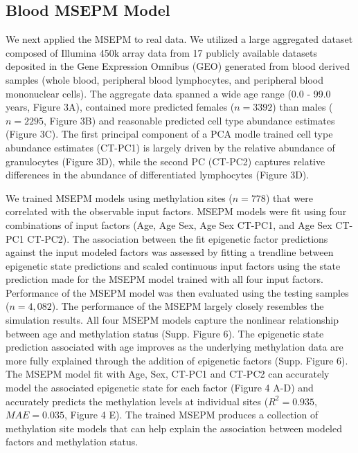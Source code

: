 \documentclass[sn-nature]{sn-jnl}
\begin{document}
{\begin{linenumbers}
\subsection{Blood MSEPM Model}
We next applied the MSEPM to real data.  We utilized a large aggregated dataset composed of Illumina 450k array data from 17 publicly available datasets\cite{Ventham2016-qj,Demetriou2013-wb,Polidoro2013-xv,Johansson2013-of,Arloth2020-lo,Liu2013-dg,Soriano-Tarraga2016-uq,Chuang2017-nk,
Zannas2019-me,Kurushima2019-pe,Voisin2015-lh,Tan2014-sg,Tserel2015-ro,Butcher2017-oz,Dabin2020-iw,Marabita2013-cj,ValleG2019-xi}
 deposited in the Gene Expression Omnibus\cite{Barrett2012-gu} (GEO) generated from blood derived samples (whole blood, peripheral blood lymphocytes, and 
peripheral blood mononuclear cells). The aggregate data spanned a wide age range (0.0  - 99.0 years, Figure 3A), contained more predicted females ($n=3392$) than males ($n=2295$, Figure 3B) 
and reasonable predicted cell type abundance estimates (Figure 3C). The first principal component of a PCA modle trained cell type abundance estimates (CT-PC1) is 
largely driven by the relative abundance of granulocytes (Figure 3D), while the second PC (CT-PC2) captures relative 
differences in the abundance of differentiated lymphocytes (Figure 3D).  

We trained MSEPM models using methylation sites ($n=778$) that were correlated with the observable input factors. 
MSEPM models were fit using four combinations of input factors (Age, Age Sex, Age Sex CT-PC1, and Age Sex CT-PC1 CT-PC2). 
The association between the fit epigenetic factor predictions against the input modeled factors was assessed by 
fitting a trendline between epigenetic state predictions and scaled continuous input factors using the state 
prediction made for the MSEPM model trained with all four input factors. Performance of the MSEPM model was then 
evaluated using the testing samples ($n=4,082$). The performance of the MSEPM largely closely resembles the 
simulation results. All four MSEPM models capture the nonlinear relationship between age and 
methylation status (Supp. Figure 6). The epigenetic state prediction associated with age improves as 
the underlying methylation data are more fully explained through the addition of epigenetic factors (Supp. Figure 6).
The MSEPM model fit with Age, Sex, CT-PC1 and CT-PC2 can accurately model the associated epigenetic state 
for each factor (Figure 4 A-D) and accurately predicts the methylation levels at individual sites ($R^2=0.935$, $MAE=0.035$, Figure 4 E). 
The trained MSEPM produces a collection of methylation site models that can help explain the association between modeled factors and methylation status. 


\end{linenumbers}}
\end{document}
